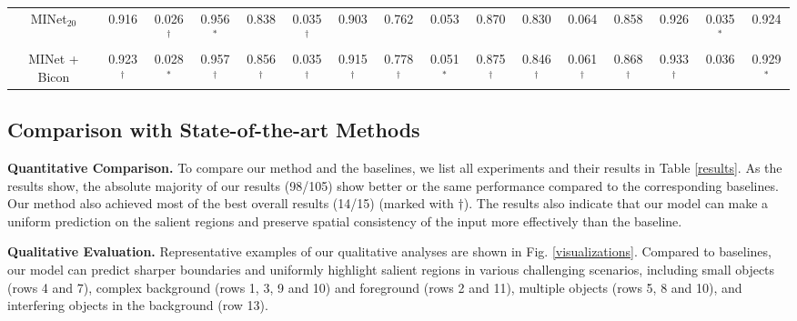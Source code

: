 \documentclass[final]{cvpr}
\begin{document}
\begin{table*}[h!]
{{\begin{tabular}{c ccc ccc ccc ccc ccc}
{MINet$_{20}$ \cite{MINet}}&0.916&\color{BrickRed}0.026\color{blue}$^\dagger$&0.956\color{blue}$^\ast$&0.838&0.035\color{blue}$^\dagger$&0.903&0.762&0.053&0.870&0.830&0.064&0.858&0.926&\color{BrickRed}0.035\color{blue}$^\ast$&0.924\\


{MINet + Bicon}&\color{BrickRed}0.923\color{blue}$^\dagger$&0.028\color{blue}$^\ast$&\color{BrickRed}0.957\color{blue}$^\dagger$&\color{BrickRed}0.856\color{blue}$^\dagger$&0.035\color{blue}$^\dagger$&\color{BrickRed}0.915\color{blue}$^\dagger$&\color{BrickRed}0.778\color{blue}$^\dagger$&\color{BrickRed}0.051\color{blue}$^\ast$&\color{BrickRed}0.875\color{blue}$^\dagger$&\color{BrickRed}0.846\color{blue}$^\dagger$&\color{BrickRed}0.061\color{blue}$^\dagger$&\color{BrickRed}0.868\color{blue}$^\dagger$&\color{BrickRed}0.933\color{blue}$^\dagger$&0.036&\color{BrickRed}0.929\color{blue}$^\ast$\\
\hline
\end{tabular}}}
\vspace{-10pt}
\end{table*}

\subsection{Comparison with State-of-the-art Methods}
\textbf{Quantitative Comparison.} To compare our method and the baselines, we list all experiments and their results in Table \ref{results}. As the results show, the absolute majority of our results (98/105) show better or the same performance compared to the corresponding baselines. Our method also achieved most of the best overall results (14/15) (marked with {\color{blue}$\dagger$}). The results also indicate that our model can make a uniform prediction on the salient regions and preserve spatial consistency of the input more effectively than the baseline.

\textbf{Qualitative Evaluation.} Representative examples of our qualitative analyses are shown in Fig. \ref{visualizations}. Compared to baselines, our model can predict sharper boundaries and uniformly highlight salient regions in various challenging scenarios, including small objects (rows 4 and 7), complex background (rows 1, 3, 9 and 10) and foreground (rows 2 and 11), multiple objects (rows 5, 8 and 10), and interfering objects in the background (row 13).

\begin{figure*}[h!]
\begin{center}
\texttt{[image: \{vis\_result.jpg]}}
\end{center}
\vspace{-8pt}
   \caption{Visual comparisons of different models.}
\label{visualizations}
\end{figure*}
\end{document}
